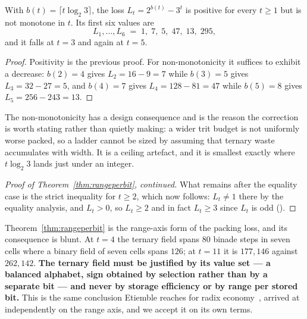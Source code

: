 \begin{theorem}
\label{thm:lossnonmonotone}
With $b(t) = \lceil t \log_2 3\rceil$, the loss $L_t = 2^{b(t)} - 3^{t}$ is
positive for every $t \ge 1$ but is not monotone in $t$. Its first six values are
\[
  L_1,\dots,L_6 \;=\; 1,\; 7,\; 5,\; 47,\; 13,\; 295 ,
\]
and it falls at $t = 3$ and again at $t = 5$.
\end{theorem}

\begin{proof}
Positivity is the previous proof. For non-monotonicity it suffices to exhibit a
decrease: $b(2) = 4$ gives $L_2 = 16 - 9 = 7$ while $b(3) = 5$ gives
$L_3 = 32 - 27 = 5$, and $b(4) = 7$ gives $L_4 = 128 - 81 = 47$ while $b(5) = 8$
gives $L_5 = 256 - 243 = 13$.
\end{proof}

The non-monotonicity has a design consequence and is the reason the correction is
worth stating rather than quietly making: a wider trit budget is not uniformly
worse packed, so a ladder cannot be sized by assuming that ternary waste
accumulates with width. It is a ceiling artefact, and it is smallest exactly where
$t\log_2 3$ lands just under an integer.

\begin{proof}[Proof of Theorem~\ref{thm:rangeperbit}, continued]
What remains after the equality case is the strict inequality for $t \ge 2$, which
now follows: $L_t \ne 1$ there by the equality analysis, and $L_t > 0$, so
$L_t \ge 2$ and in fact $L_t \ge 3$ since $L_t$ is odd
().
\end{proof}

Theorem~\ref{thm:rangeperbit} is the range-axis form of the packing loss, and its
consequence is blunt. At $t = 4$ the ternary field spans $80$ binade steps in
seven cells where a binary field of seven cells spans $126$; at $t = 11$ it is
$177{,}146$ against $262{,}142$. \textbf{The ternary field must be justified by
its value set --- a balanced alphabet, sign obtained by selection rather than by a
separate bit --- and never by storage efficiency or by range per stored bit.}
This is the same conclusion Etiemble reaches for radix
economy~\cite{etiemble2019}, arrived at independently on the range axis,
and we accept it on its own terms.

